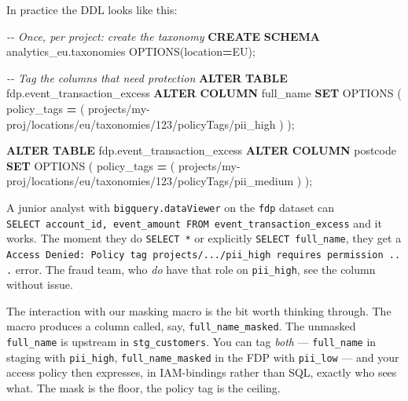 \documentclass[
  11pt,
  british,
  oneside]{book}
\newenvironment{Shaded}{\begin{snugshade}}{\end{snugshade}}
\newcommand{\CommentTok}[1]{\textcolor[rgb]{0.56,0.35,0.01}{\textit{#1}}}
\newcommand{\KeywordTok}[1]{\textcolor[rgb]{0.13,0.29,0.53}{\textbf{#1}}}
\newcommand{\NormalTok}[1]{#1}
\newcommand{\OperatorTok}[1]{\textcolor[rgb]{0.81,0.36,0.00}{\textbf{#1}}}
\newcommand{\StringTok}[1]{\textcolor[rgb]{0.31,0.60,0.02}{#1}}
\begin{document}
In practice the DDL looks like this:

\begin{Shaded}
\begin{Highlighting}[]
\CommentTok{{-}{-} Once, per project: create the taxonomy}
\KeywordTok{CREATE} \KeywordTok{SCHEMA}\NormalTok{ \textasciigrave{}analytics\_eu.taxonomies\textasciigrave{} OPTIONS(location}\OperatorTok{=}\StringTok{\textquotesingle{}EU\textquotesingle{}}\NormalTok{);}

\CommentTok{{-}{-} Tag the columns that need protection}
\KeywordTok{ALTER} \KeywordTok{TABLE}\NormalTok{ \textasciigrave{}fdp.event\_transaction\_excess\textasciigrave{}}
\KeywordTok{ALTER} \KeywordTok{COLUMN}\NormalTok{ full\_name}
\KeywordTok{SET}\NormalTok{ OPTIONS (}
\NormalTok{  policy\_tags }\OperatorTok{=}\NormalTok{ (}
    \StringTok{\textquotesingle{}projects/my{-}proj/locations/eu/taxonomies/123/policyTags/pii\_high\textquotesingle{}}
\NormalTok{  )}
\NormalTok{);}

\KeywordTok{ALTER} \KeywordTok{TABLE}\NormalTok{ \textasciigrave{}fdp.event\_transaction\_excess\textasciigrave{}}
\KeywordTok{ALTER} \KeywordTok{COLUMN}\NormalTok{ postcode}
\KeywordTok{SET}\NormalTok{ OPTIONS (}
\NormalTok{  policy\_tags }\OperatorTok{=}\NormalTok{ (}
    \StringTok{\textquotesingle{}projects/my{-}proj/locations/eu/taxonomies/123/policyTags/pii\_medium\textquotesingle{}}
\NormalTok{  )}
\NormalTok{);}
\end{Highlighting}
\end{Shaded}

A junior analyst with \texttt{bigquery.dataViewer} on the \texttt{fdp}
dataset can
\texttt{SELECT\ account\_id,\ event\_amount\ FROM\ event\_transaction\_excess}
and it works. The moment they do \texttt{SELECT\ *} or explicitly
\texttt{SELECT\ full\_name}, they get a
\texttt{Access\ Denied:\ Policy\ tag\ projects/.../pii\_high\ requires\ permission\ ...}
error. The fraud team, who \emph{do} have that role on
\texttt{pii\_high}, see the column without issue.

The interaction with our masking macro is the bit worth thinking
through. The macro produces a column called, say,
\texttt{full\_name\_masked}. The unmasked \texttt{full\_name} is
upstream in \texttt{stg\_customers}. You can tag \emph{both} ---
\texttt{full\_name} in staging with \texttt{pii\_high},
\texttt{full\_name\_masked} in the FDP with \texttt{pii\_low} --- and
your access policy then expresses, in IAM-bindings rather than SQL,
exactly who sees what. The mask is the floor, the policy tag is the
ceiling.
\end{document}
